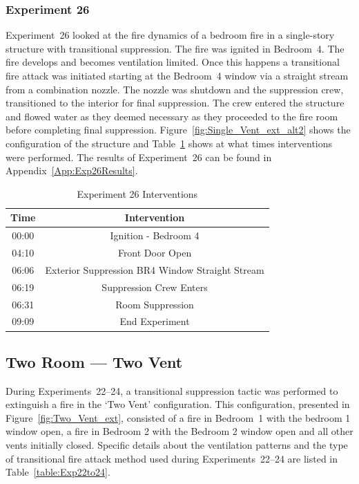 \documentclass[12pt,oneside]{book}
\begin{document}
\subsubsection{Experiment 26}
Experiment~26 looked at the fire dynamics of a bedroom fire in a single-story structure with transitional suppression. The fire was ignited in Bedroom~4. The fire develops and becomes ventilation limited. Once this happens a transitional fire attack was initiated starting at the Bedroom~4 window via a straight stream from a combination nozzle. The nozzle was shutdown and the suppression crew, transitioned to the interior for final suppression. The crew entered the structure and flowed water as they deemed necessary as they proceeded to the fire room before completing final suppression.  Figure~\ref{fig:Single_Vent_ext_alt2} shows the configuration of the structure and Table~\ref{Table:Exp26Interventions} shows at what times interventions were performed. The results of Experiment~26 can be found in Appendix~\ref{App:Exp26Results}. 


\begin{table}[H]
	\centering
	\caption{Experiment 26 Interventions}
	\begin{tabular}{|c|c|} 
		\hline
		Time & Intervention \\ \hline \hline
		00:00 & Ignition - Bedroom 4 \\ \hline
		04:10 & Front Door Open \\ \hline
		06:06 & Exterior Suppression BR4 Window Straight Stream \\ \hline
		06:19 & Suppression Crew Enters\\ \hline
		06:31 & Room Suppression \\ \hline 
		09:09 & End Experiment\\ \hline
	\end{tabular}
	\label{Table:Exp26Interventions}
\end{table}

\clearpage

\subsection{Two Room --- Two Vent}
During Experiments~22--24, a transitional suppression tactic was performed to extinguish a fire in the `Two Vent' configuration. This configuration, presented in Figure~\ref{fig:Two_Vent_ext}, consisted of a fire in Bedroom~1 with the bedroom 1 window open, a fire in Bedroom 2 with the Bedroom 2 window open and all other vents initially closed. Specific details about the ventilation patterns and the type of transitional fire attack method used during Experiments~22--24 are listed in Table~\ref{table:Exp22to24}. 
\end{document}
